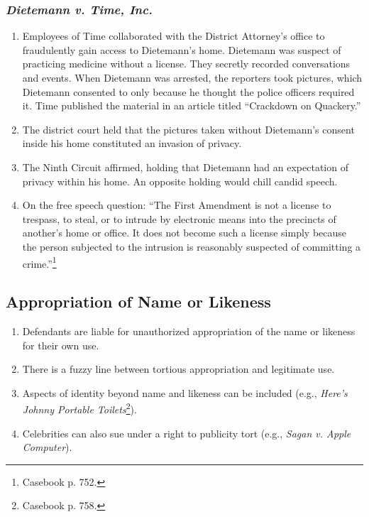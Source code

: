 \subsubsection{\emph{Dietemann v. Time, Inc.}}

\begin{enumerate}
    \item Employees of Time collaborated with the District Attorney's office 
    to fraudulently gain access to Dietemann's home. Dietemann was suspect of 
    practicing medicine without a license. They secretly recorded 
    conversations and events. When Dietemann was arrested, the reporters took 
    pictures, which Dietemann consented to only because he thought the police 
    officers required it. Time published the material in an article titled 
    ``Crackdown on Quackery.''
    \item The district court held that the pictures taken without Dietemann's 
    consent inside his home constituted an invasion of privacy.
    \item The Ninth Circuit affirmed, holding that Dietemann had an 
    expectation of privacy within his home. An opposite holding would chill 
    candid speech.
    \item On the free speech question: ``The First Amendment is not a license 
    to trespass, to steal, or to intrude by electronic means into the 
    precincts of another's home or office. It does not become such a license 
    simply because the person subjected to the intrusion is reasonably 
    suspected of committing a crime.''\footnote{Casebook p. 752.}
\end{enumerate}

\subsection{Appropriation of Name or Likeness}

\begin{enumerate}
    \item Defendants are liable for unauthorized appropriation of the name or 
    likeness for their own use.
    \item There is a fuzzy line between tortious appropriation and legitimate 
    use.
    \item Aspects of identity beyond name and likeness can be included (e.g., 
    \emph{Here's Johnny Portable Toilets}\footnote{Casebook p. 758.}).
    \item Celebrities can also sue under a right to publicity tort (e.g., 
    \emph{Sagan v. Apple Computer}).
\end{enumerate}

